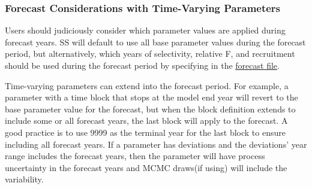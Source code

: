 


\subsubsection{Forecast Considerations with Time-Varying Parameters}

Users should judiciously consider which parameter values are applied during forecast years. SS will default to use all base parameter values during the forecast period, but alternatively, which years of selectivity, relative F, and recruitment should be used during the forecast period by specifying in the \hyperlink{fore-specify}{forecast file}.

Time-varying parameters can extend into the forecast period. For example, a parameter with a time block that stops at the model end year will revert to the base parameter value for the forecast, but when the block definition extends to include some or all forecast years, the last block will apply to the forecast. A good practice is to use 9999 as the terminal year for the last block to ensure including all forecast years. If a parameter has deviations and the deviations' year range includes the forecast years, then the parameter will have process uncertainty in the forecast years and MCMC draws(if using) will include the variability.

